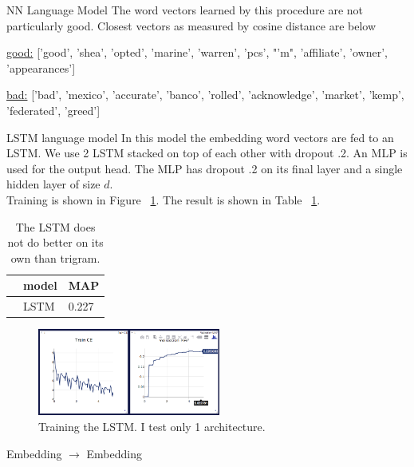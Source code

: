 \documentclass[11pt]{article}
\begin{document}
\begin{subsection}{NN Language Model}
The word vectors learned by this procedure are not particularly good. Closest vectors as measured by cosine distance are below\\
\centerline{\underline{good:} ['good',
 'shea',
 'opted',
 'marine',
 'warren',
 'pcs',
 "'m",
 'affiliate',
 'owner',
 'appearances']}
 
 \centerline{\underline{bad:} ['bad',
 'mexico',
 'accurate',
 'banco',
 'rolled',
 'acknowledge',
 'market',
 'kemp',
 'federated',
 'greed']}


\end{subsection}

\begin{subsection}{LSTM language model}
In this model the embedding word vectors are fed to an LSTM. We use 2 LSTM stacked on top of each other with dropout .2. An MLP is used for the output head. The MLP has dropout .2 on its final layer and a single hidden layer of size $d$.\\
Training is shown in Figure ~\ref{fig:lstmtrain}. The result is shown in Table ~\ref{tab:lstm}.

\begin{table}
  \begin{center}
    \begin{tabular}{@{}lll@{}}
      \toprule
      & model & MAP\\
      \midrule
      & LSTM & 0.227 \\
      \bottomrule
    \end{tabular}
  \end{center}
  \caption{\label{tab:lstm} The LSTM does not do better on its own than trigram.}
 \end{table}

 \begin{figure}
  \centering
  \includegraphics[width=6cm]{imgs/lstmtrain}
  \caption{\label{fig:lstmtrain} Training the LSTM. I test only 1 architecture.}
\end{figure}

\end{subsection}


\begin{subsection}{Embedding $\rightarrow$ Embedding}



\end{subsection}
\end{document}
